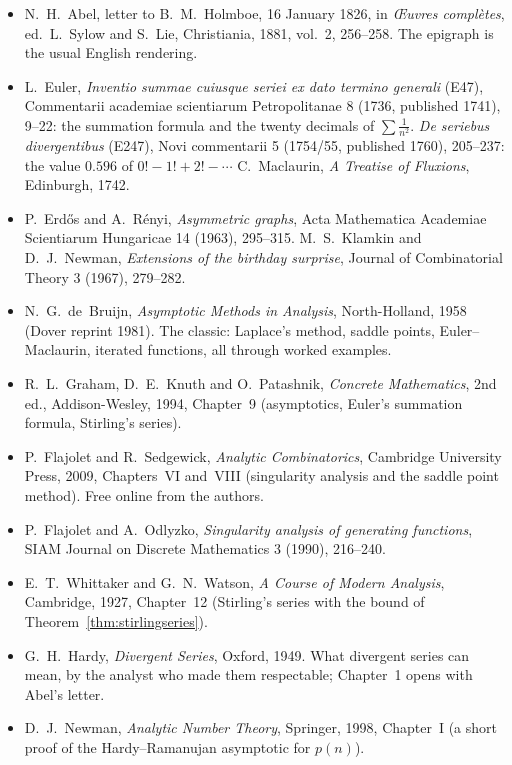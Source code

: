 \begin{itemize}
\item N.~H.~Abel, letter to B.~M.~Holmboe, 16 January 1826, in \emph{\OE uvres compl\`etes}, ed.\ L.~Sylow and S.~Lie, Christiania, 1881,
vol.~2, 256--258. The epigraph is the usual English rendering.
\item L.~Euler, \emph{Inventio summae cuiusque seriei ex dato termino generali} (E47), Commentarii academiae scientiarum Petropolitanae 8
(1736, published 1741), 9--22: the summation formula and the twenty decimals of $\sum\frac1{n^2}$. \emph{De seriebus divergentibus} (E247),
Novi commentarii 5 (1754/55, published 1760), 205--237: the value $0.596$ of $0!-1!+2!-\cdots$ C.~Maclaurin, \emph{A Treatise of Fluxions}, Edinburgh, 1742.
\item P.~Erd\H os and A.~R\'enyi, \emph{Asymmetric graphs}, Acta Mathematica Academiae Scientiarum Hungaricae 14 (1963), 295--315.
M.~S.~Klamkin and D.~J.~Newman, \emph{Extensions of the birthday surprise}, Journal of Combinatorial Theory 3 (1967), 279--282.
\item N.~G.~de~Bruijn, \emph{Asymptotic Methods in Analysis}, North-Holland, 1958 (Dover reprint 1981). The classic: Laplace's method, saddle points,
Euler--Maclaurin, iterated functions, all through worked examples.
\item R.~L.~Graham, D.~E.~Knuth and O.~Patashnik, \emph{Concrete Mathematics}, 2nd ed., Addison-Wesley, 1994, Chapter~9 (asymptotics, Euler's
summation formula, Stirling's series).
\item P.~Flajolet and R.~Sedgewick, \emph{Analytic Combinatorics}, Cambridge University Press, 2009, Chapters~VI and~VIII (singularity analysis and the
saddle point method). Free online from the authors.
\item P.~Flajolet and A.~Odlyzko, \emph{Singularity analysis of generating functions}, SIAM Journal on Discrete Mathematics 3 (1990), 216--240.
\item E.~T.~Whittaker and G.~N.~Watson, \emph{A Course of Modern Analysis}, Cambridge, 1927, Chapter~12 (Stirling's series with the bound of
Theorem~\ref{thm:stirlingseries}).
\item G.~H.~Hardy, \emph{Divergent Series}, Oxford, 1949. What divergent series can mean, by the analyst who made them respectable; Chapter~1 opens
with Abel's letter.
\item D.~J.~Newman, \emph{Analytic Number Theory}, Springer, 1998, Chapter~I (a short proof of the Hardy--Ramanujan asymptotic for $p(n)$).
\end{itemize}
